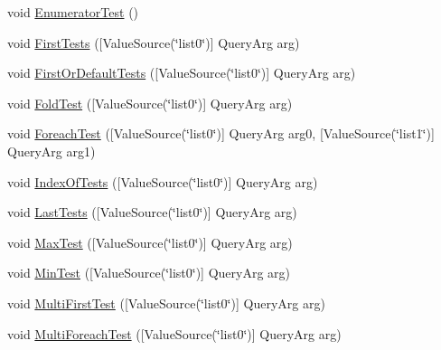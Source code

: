 \begin{DoxyCompactItemize}
\item 
void \mbox{\hyperlink{class_leap_1_1_unity_1_1_tests_1_1_query_tests_a71d64345aedbf5a5556dcc154af06218}{Enumerator\+Test}} ()
\item 
void \mbox{\hyperlink{class_leap_1_1_unity_1_1_tests_1_1_query_tests_a0573ebf5ac67a01f925590baa34c96d6}{First\+Tests}} (\mbox{[}Value\+Source(\char`\"{}list0\char`\"{})\mbox{]} Query\+Arg arg)
\item 
void \mbox{\hyperlink{class_leap_1_1_unity_1_1_tests_1_1_query_tests_a2140f1aa85ae7639e9919aaa2fdc7d4b}{First\+Or\+Default\+Tests}} (\mbox{[}Value\+Source(\char`\"{}list0\char`\"{})\mbox{]} Query\+Arg arg)
\item 
void \mbox{\hyperlink{class_leap_1_1_unity_1_1_tests_1_1_query_tests_aa95430f50d25682e20764f3b131a299d}{Fold\+Test}} (\mbox{[}Value\+Source(\char`\"{}list0\char`\"{})\mbox{]} Query\+Arg arg)
\item 
void \mbox{\hyperlink{class_leap_1_1_unity_1_1_tests_1_1_query_tests_a6d5935d2f07cd029f690bbbf146553a8}{Foreach\+Test}} (\mbox{[}Value\+Source(\char`\"{}list0\char`\"{})\mbox{]} Query\+Arg arg0, \mbox{[}Value\+Source(\char`\"{}list1\char`\"{})\mbox{]} Query\+Arg arg1)
\item 
void \mbox{\hyperlink{class_leap_1_1_unity_1_1_tests_1_1_query_tests_a74bff637aa940161e7781b930cc12e54}{Index\+Of\+Tests}} (\mbox{[}Value\+Source(\char`\"{}list0\char`\"{})\mbox{]} Query\+Arg arg)
\item 
void \mbox{\hyperlink{class_leap_1_1_unity_1_1_tests_1_1_query_tests_aa4a662a8acf5c66e247b4f02b3430739}{Last\+Tests}} (\mbox{[}Value\+Source(\char`\"{}list0\char`\"{})\mbox{]} Query\+Arg arg)
\item 
void \mbox{\hyperlink{class_leap_1_1_unity_1_1_tests_1_1_query_tests_aef878cd4eb6220f4a0596cf796ffcd78}{Max\+Test}} (\mbox{[}Value\+Source(\char`\"{}list0\char`\"{})\mbox{]} Query\+Arg arg)
\item 
void \mbox{\hyperlink{class_leap_1_1_unity_1_1_tests_1_1_query_tests_a669814dda36f3656ccb56a00c19f632c}{Min\+Test}} (\mbox{[}Value\+Source(\char`\"{}list0\char`\"{})\mbox{]} Query\+Arg arg)
\item 
void \mbox{\hyperlink{class_leap_1_1_unity_1_1_tests_1_1_query_tests_a1e678d24f8674a66cbf7d3f94e112d58}{Multi\+First\+Test}} (\mbox{[}Value\+Source(\char`\"{}list0\char`\"{})\mbox{]} Query\+Arg arg)
\item 
void \mbox{\hyperlink{class_leap_1_1_unity_1_1_tests_1_1_query_tests_a918d08deb5b680f74921bcffb6a3fb9d}{Multi\+Foreach\+Test}} (\mbox{[}Value\+Source(\char`\"{}list0\char`\"{})\mbox{]} Query\+Arg arg)

\end{DoxyCompactItemize}
